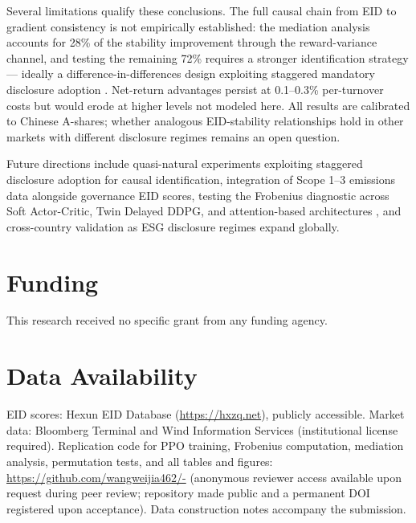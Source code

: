 \documentclass[12pt]{article}
\begin{document}
Several limitations qualify these conclusions. The full causal chain
from EID to gradient consistency is not empirically established: the
mediation analysis accounts for 28\% of the stability improvement
through the reward-variance channel, and testing the remaining 72\%
requires a stronger identification strategy --- ideally a
difference-in-differences design exploiting staggered mandatory
disclosure adoption \citep{cai2016corporate}. Net-return advantages
persist at 0.1--0.3\% per-turnover costs but would erode at higher
levels not modeled here. All results are calibrated to Chinese
A-shares; whether analogous EID-stability relationships hold in other
markets with different disclosure regimes remains an open question.

Future directions include quasi-natural experiments exploiting
staggered disclosure adoption for causal identification, integration
of Scope 1--3 emissions data alongside governance EID scores, testing
the Frobenius diagnostic across Soft Actor-Critic, Twin Delayed DDPG,
and attention-based architectures \citep{lecun2015deep}, and
cross-country validation as ESG disclosure regimes expand globally.

\section*{Funding}

This research received no specific grant from any funding agency.

\section*{Data Availability}

EID scores: Hexun EID Database (\url{https://hxzq.net}), publicly
accessible. Market data: Bloomberg Terminal and Wind Information Services
(institutional license required). Replication code for PPO training,
Frobenius computation, mediation analysis, permutation tests, and all
tables and figures: \url{https://github.com/wangweijia462/-} (anonymous
reviewer access available upon request during peer review; repository
made public and a permanent DOI registered upon acceptance). Data
construction notes accompany the submission.


\end{document}
